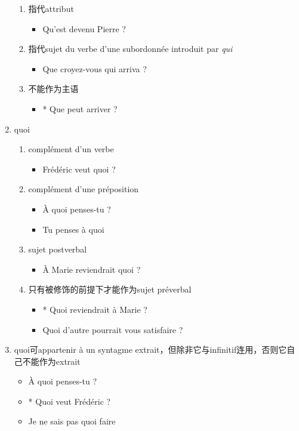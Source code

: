 \documentclass[UTF8]{report}
\begin{document}
\begin{enumerate}
\begin{enumerate}
        \item 指代attribut
        \begin{itemize}
            \item Qu’est devenu Pierre ?
        \end{itemize}
        \item 指代sujet du verbe d’une subordonnée introduit par \textit{qui}
        \begin{itemize}
            \item Que croyez-vous qui arriva ?
        \end{itemize}
        \item 不能作为主语
        \begin{itemize}
            \item * Que peut arriver ?
        \end{itemize}
    \end{enumerate}
    \item quoi
    \begin{enumerate}
        \item complément d’un verbe
        \begin{itemize}
            \item Frédéric veut quoi ?
        \end{itemize}
        \item complément d’une préposition
        \begin{itemize}
            \item À quoi penses-tu ?
            \item Tu penses à quoi
        \end{itemize}
        \item sujet postverbal
        \begin{itemize}
            \item À Marie reviendrait quoi ?
        \end{itemize}
        \item 只有被修饰的前提下才能作为sujet préverbal
        \begin{itemize}
            \item * Quoi reviendrait à Marie ?
            \item Quoi d’autre pourrait vous satisfaire ?
        \end{itemize}
    \end{enumerate}
    \item quoi可appartenir à un syntagme extrait，但除非它与infinitif连用，否则它自己不能作为extrait
    \begin{itemize}
        \item À quoi penses-tu ?
        \item * Quoi veut Frédéric ?
        \item Je ne sais pas quoi faire
    \end{itemize}
\end{enumerate}
\end{document}
